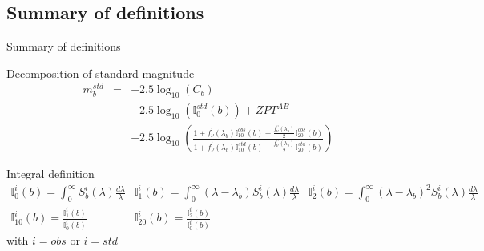 \documentclass{beamer}
\begin{document}
\subsection{Summary of definitions}
\begin{frame}{Summary of definitions}
\begin{alertblock}{Decomposition of standard magnitude}
\begin{eqnarray}
m_b^{std} & = & -2.5 \log_{10}(C_b)  \nonumber \\
          &   &  + 2.5 \log_{10}(\mathbb{I}_0^{std}(b)) + ZPT^{AB}  \nonumber \\
          &   &  + 2.5 \log_{10}\left( 
\frac{1 + f_\nu^\prime(\lambda_b)\mathbb{I}^{obs}_{10}(b)  +\frac{f_\nu^{\prime\prime}(\lambda_b)}{2}\mathbb{I}_{20}^{obs}(b)}
{1 + f_\nu^\prime(\lambda_b)\mathbb{I}^{std}_{10}(b)  +\frac{f_\nu^{\prime\prime}(\lambda_b)}{2}\mathbb{I}_{20}^{std}(b)}\right)
\end{eqnarray}
\end{alertblock}

\begin{block}{Integral definition}
{\footnotesize
$
\begin{array}{lll}
\mathbb{I}_0^i(b) = \int_0^{\infty} S_b^i(\lambda) \frac{d\lambda}{\lambda}
& \mathbb{I}_1^i(b) = \int_0^{\infty} (\lambda-\lambda_b) S_b^i(\lambda) \frac{d\lambda}{\lambda}
& \mathbb{I}_2^i(b) = \int_0^{\infty} (\lambda-\lambda_b)^2 S_b^i(\lambda) \frac{d\lambda}{\lambda} \\
\mathbb{I}^i_{10}(b) = \frac{\mathbb{I}^i_1(b)}{\mathbb{I}^i_0(b)} &
\mathbb{I}^i_{20}(b) = \frac{\mathbb{I}^i_2(b)}{\mathbb{I}^i_0(b)} & 
\end{array}
$
}
with $i=obs$ or $i=std$
\end{block}
\end{frame}
\end{document}
